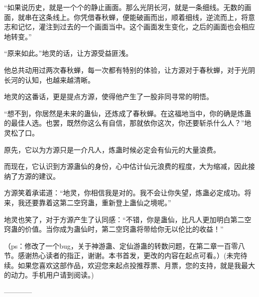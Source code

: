 \begin{this_body}
“如果说历史，就是一个个的静止画面。那么光阴长河，就是一条细线。无数的画面，就串在这条线上。你凭借春秋蝉，便能破画而出，顺着细线，逆流而上，将意志和记忆，灌注到过去的一个画面当中。这个画面发生变化，之后的画面也会相应地转变。”

“原来如此。”地灵的话，让方源受益匪浅。

他总共动用过两次春秋蝉，每一次都有特别的体验，让方源对于春秋蝉，对于光阴长河的认知，也越来越清晰。

地灵的这番话，更是提点方源，使得他产生了一股非同寻常的明悟。

“想不到，你居然是未来的蛊仙，还炼成了春秋蝉。在这福地当中，你的确是炼蛊的最佳人选。也罢，既然你这么有自信，那就依你这次，你还要斩杀什么人？”地灵松了口。

原先，它以为方源只是一介凡人，炼蛊时候必定会有仙元的大量浪费。

而现在，它认识到方源蛊仙的身份，心中估计仙元浪费的程度，大为缩减，因此接纳了方源的建议。

方源笑着承诺道：“地灵，你相信我是对的。我不会让你失望，炼蛊必定成功。将来，我还要靠着这第二空窍蛊，重新登上蛊仙之境呢。”

地灵也笑了，对于方源产生了认同感：“不错，你是蛊仙，比凡人更加明白第二空窍蛊的价值。当你成为蛊仙时，第二空窍蛊将带给你无以伦比的收益！”

（ps：修改了一个bug，关于神游蛊、定仙游蛊的转数问题，在第二章一百零八节。感谢热心读者的指正，谢谢。本书首发，更改的内容在起点可看。）(未完待续。如果您喜欢这部作品，欢迎您来起点投推荐票、月票，您的支持，就是我最大的动力。手机用户请到阅读。)

------------

\end{this_body}

